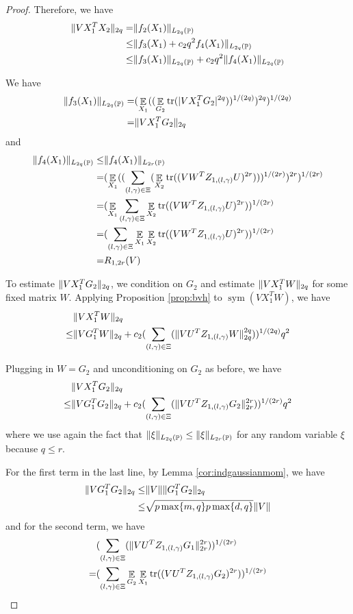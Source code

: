 \documentclass[11pt]{amsart}
\numberwithin{equation}{section}
\numberwithin{equation}{section}
\DeclareMathOperator{\E}{\mathbb{E}}
\DeclareMathOperator{\Pb}{\mathbb{P}}
\DeclareMathOperator*{\tr}{tr}
\DeclareMathOperator{\sym}{sym}
\DeclarePairedDelimiter{\norm}{\lVert}{\rVert}
\begin{document}
\begin{proof}
Therefore, we have
\begin{align*}
    \norm{VX_1^TX_2}_{2q}  = &\norm{f_2(X_1)}_{L_{2q}(\Pb)} 
\\  \le & \norm{f_3(X_1)+c_2q^{2}f_4(X_1)}_{L_{2q}(\Pb)} 
\\ \le & \norm{f_3(X_1)}_{L_{2q}(\Pb)} + c_2q^{2}\norm{f_4(X_1)}_{L_{2q}(\Pb)} 
\end{align*}

We have
\begin{align*}
    \norm{f_3(X_1)}_{L_{2q}(\Pb)} = & (\E_{X_1}((\E_{G_2} \tr (|VX_1^TG_2|^{2q}))^{1/(2q)})^{2q})^{1/(2q)} \\ = &\norm{VX_1^TG_2}_{2q}
\end{align*}
and
\begin{align*}
    \norm{f_4(X_1)}_{L_{2q}(\Pb)} \le &\norm{f_4(X_1)}_{L_{2r}(\Pb)} \\= & (\E_{X_1}((\sum\limits_{(l,\gamma) \in \Xi}(\E_{X_2}\tr((VW^TZ_{1,(l,\gamma)}U)^{2r})))^{1/(2r)})^{2r})^{1/(2r)} \\ = & (\E_{X_1}\sum\limits_{(l,\gamma) \in \Xi}\E_{X_2}\tr((VW^TZ_{1,(l,\gamma)}U)^{2r}))^{1/(2r)} 
    \\ = & (\sum\limits_{(l,\gamma) \in \Xi}\E_{X_1}\E_{X_2}\tr((VW^TZ_{1,(l,\gamma)}U)^{2r}))^{1/(2r)}
    \\=& R_{1,2r}(V)
\end{align*}

To estimate $\norm{VX_1^TG_2}_{2q}$, we condition on $G_2$ and estimate $\norm{VX_1^TW}_{2q}$ for some fixed matrix $W$. Applying Proposition \ref{prop:bvh} to $\sym(VX_1^TW)$, we have
\begin{align*}
    &\norm{VX_1^TW}_{2q} 
    \\ \le & \norm{VG_1^TW}_{2q} + c_2 (\sum\limits_{(l,\gamma) \in \Xi}(\norm{VU^TZ_{1,(l,\gamma)}W}_{2q}^{2q}))^{1/(2q)}q^{2}
\end{align*}

Plugging in $W=G_2$ and unconditioning on $G_2$ as before, we have
\begin{align*}
    &\norm{VX_1^TG_2}_{2q} 
    \\ \le & \norm{VG_1^TG_2}_{2q} + c_2 (\sum\limits_{(l,\gamma) \in \Xi}(\norm{VU^TZ_{1,(l,\gamma)}G_2}_{2r}^{2r}))^{1/(2r)}q^{2}
\end{align*}
where we use again the fact that $\norm{\xi}_{L_{2q}(\Pb)} \le \norm{\xi}_{L_{2r}(\Pb)}$ for any random variable $\xi$ because $q \le r$.

For the first term in the last line, by Lemma \ref{cor:indgaussianmom}, we have
\begin{align*}
    \norm{VG_1^TG_2}_{2q}
     \le &\norm{V}\norm{G_1^TG_2}_{2q}
    \\ \le &\sqrt{p\max\{m,q\}p\max\{d,q\}}\norm{V}
\end{align*}
and for the second term, we have
\begin{align*}
    &(\sum\limits_{(l,\gamma) \in \Xi}(\norm{VU^TZ_{1,(l,\gamma)}G_1}_{2r}^{2r}))^{1/(2r)} 
    \\ = & (\sum\limits_{(l,\gamma) \in \Xi}\E_{G_2}\E_{X_1}\tr((VU^TZ_{1,(l,\gamma)}G_2)^{2r}))^{1/(2r)}
\end{align*}



\end{proof}
\end{document}
